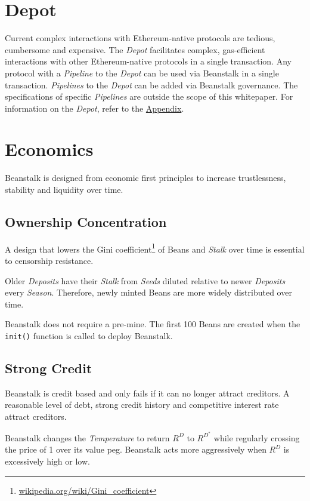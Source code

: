 \documentclass[tikz]{article}
\newcommand{\code}[1]{\texttt{#1}}
\newcommand{\term}[1]{\textsl{#1}}
\newcommand{\fref}[1]{\footnote{\href{http://#1}{#1}}}
\newcommand{\Bean}{} %
\begin{document}
\section{Depot}
Current complex interactions with Ethereum-native protocols are tedious, cumbersome and expensive. The \term{Depot} facilitates complex, gas-efficient interactions with other Ethereum-native protocols in a single transaction. Any protocol with a \term{Pipeline} to the \term{Depot} can be used via Beanstalk in a single transaction. \term{Pipelines} to the \term{Depot} can be added via Beanstalk governance. The specifications of specific \term{Pipelines} are outside the scope of this whitepaper. For information on the \term{Depot}, refer to the \hyperlink{section.12}{Appendix}.

\section{Economics}
Beanstalk is designed from economic first principles to increase trustlessness, stability and liquidity over time.

\subsection{Ownership Concentration}
A design that lowers the Gini coefficient\fref{wikipedia.org/wiki/Gini\_coefficient} of Beans and \term{Stalk} over time is essential to censorship resistance.

Older \term{Deposits} have their \term{Stalk} from \term{Seeds} diluted relative to newer \term{Deposits} every \term{Season}. Therefore, newly minted Beans are more widely distributed over time.

Beanstalk does not require a pre-mine. The first 100 Beans are created when the \code{init()} function is called to deploy Beanstalk.

\subsection{Strong Credit}
Beanstalk is credit based and only fails if it can no longer attract creditors. A reasonable level of debt, strong credit history and competitive interest rate attract creditors. 

Beanstalk changes the \term{Temperature} to return $R^D$ to $R^{D^*}$ while regularly crossing the price of \Bean1 over its value peg. Beanstalk acts more aggressively when $R^D$ is excessively high or low.
\end{document}
